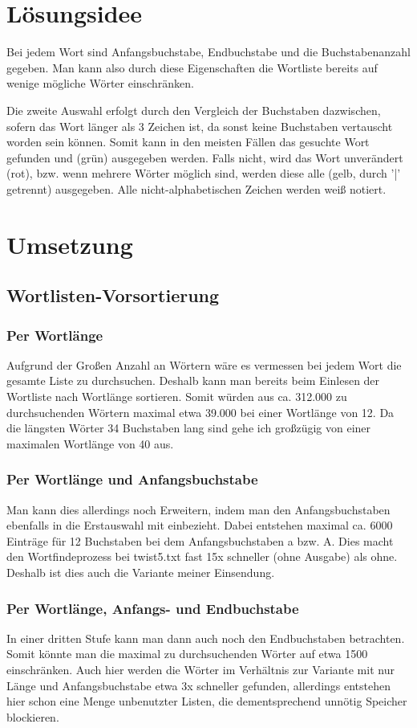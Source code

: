 \documentclass[a4paper,10pt,ngerman]{scrartcl}
\title{\Aufgabe}
\author{\Name\\Team-ID: \TeamId}
\date{\today}
\newcommand{\newsection}{\vspace{3\baselineskip}\section}
\newcommand{\newsubsection}{\vspace{2\baselineskip}\subsection}
\newcommand{\newsubsubsection}{\vspace{1\baselineskip}\subsubsection}
\begin{document}
\maketitle
\vspace{5\baselineskip}
\tableofcontents
\clearpage



\newsection{Lösungsidee}
\vspace{1\baselineskip}
Bei jedem Wort sind Anfangsbuchstabe, Endbuchstabe und die Buchstabenanzahl gegeben. Man kann also durch diese Eigenschaften die Wortliste bereits auf wenige mögliche Wörter einschränken.

Die zweite Auswahl erfolgt durch den Vergleich der Buchstaben dazwischen, sofern das Wort länger als 3 Zeichen ist, da sonst keine Buchstaben vertauscht worden sein können. Somit kann in den meisten Fällen das gesuchte Wort gefunden und (grün) ausgegeben werden. Falls nicht, wird das Wort unverändert (rot), bzw. wenn mehrere Wörter möglich sind, werden diese alle (gelb, durch '|' getrennt) ausgegeben. Alle nicht-alphabetischen Zeichen werden weiß notiert.



\newsection{Umsetzung}


\newsubsection{Wortlisten-Vorsortierung}

\newsubsubsection{Per Wortlänge} %
Aufgrund der Großen Anzahl an Wörtern wäre es vermessen bei jedem Wort die gesamte Liste zu durchsuchen. Deshalb kann man bereits beim Einlesen der Wortliste nach Wortlänge sortieren. Somit würden aus ca. 312.000 zu durchsuchenden Wörtern maximal etwa 39.000 bei einer Wortlänge von 12.
Da die längsten Wörter 34 Buchstaben lang sind gehe ich großzügig von einer maximalen Wortlänge von 40 aus.

\newsubsubsection{Per Wortlänge und Anfangsbuchstabe} %
Man kann dies allerdings noch Erweitern, indem man den Anfangsbuchstaben ebenfalls in die Erstauswahl mit einbezieht. Dabei entstehen maximal ca. 6000 Einträge für 12 Buchstaben bei dem Anfangsbuchstaben a bzw. A. Dies macht den Wortfindeprozess bei twist5.txt fast 15x schneller (ohne Ausgabe) als ohne. Deshalb ist dies auch die Variante meiner Einsendung.

\newsubsubsection{Per Wortlänge, Anfangs- und Endbuchstabe} %
In einer dritten Stufe kann man dann auch noch den Endbuchstaben betrachten. Somit könnte man die maximal zu durchsuchenden Wörter auf etwa 1500 einschränken. Auch hier werden die Wörter im Verhältnis zur Variante mit nur Länge und Anfangsbuchstabe etwa 3x schneller gefunden, allerdings entstehen hier schon eine Menge unbenutzter Listen, die dementsprechend unnötig Speicher blockieren.
\end{document}
